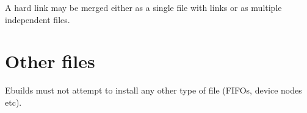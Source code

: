 A hard link may be merged either as a single file with links or as multiple independent files.

\section{Other files}

Ebuilds must not attempt to install any other type of file (FIFOs, device nodes etc).


